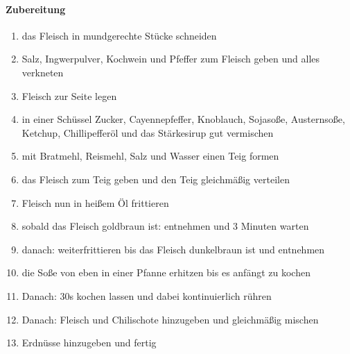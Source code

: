 \paragraph{Zubereitung}
\begin{enumerate}[noitemsep]
	\item das Fleisch in mundgerechte Stücke schneiden 
	\item Salz, Ingwerpulver, Kochwein und Pfeffer zum Fleisch geben und alles verkneten
	\item Fleisch zur Seite legen
	\item in einer Schüssel Zucker, Cayennepfeffer, Knoblauch, Sojasoße, Austernsoße, Ketchup, Chillipefferöl und das Stärkesirup gut vermischen
	\item mit Bratmehl, Reismehl, Salz und Wasser einen Teig formen
	\item das Fleisch zum Teig geben und den Teig gleichmäßig verteilen
	\item Fleisch nun in heißem Öl frittieren 
	\item sobald das Fleisch goldbraun ist: entnehmen und 3 Minuten warten
	\item danach: weiterfrittieren bis das Fleisch dunkelbraun ist und entnehmen
	\item die Soße von eben in einer Pfanne erhitzen bis es anfängt zu kochen 
	\item Danach: 30s kochen lassen und dabei kontinuierlich rühren
	\item Danach: Fleisch und Chilischote hinzugeben und gleichmäßig mischen
	\item Erdnüsse hinzugeben und fertig
\end{enumerate}